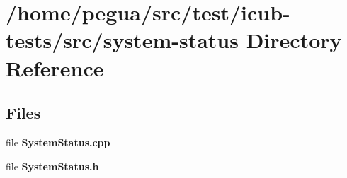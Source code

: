 \section{/home/pegua/src/test/icub-\/tests/src/system-\/status Directory Reference}
\label{dir_22920df90588b6b2fe85332a8ebd338b}
\subsection*{Files}
\begin{DoxyCompactItemize}
\item 
file {\bfseries System\-Status.\-cpp}
\item 
file {\bfseries System\-Status.\-h}
\end{DoxyCompactItemize}
